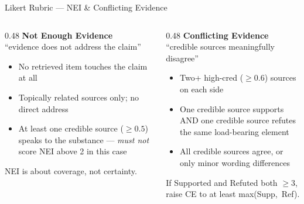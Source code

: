 \documentclass[11pt, aspectratio=169]{beamer}
\begin{document}
\begin{frame}{Likert Rubric — NEI \& Conflicting Evidence}
  \begin{columns}[T]
    \begin{column}{0.48\textwidth}
      \textbf{\textcolor{slate}{Not Enough Evidence}}\\
      ``evidence does not address the claim''

      \bigskip
      \begin{itemize}\setlength{\itemsep}{8pt}
        \item[\textbf{5}] No retrieved item touches the claim at all
        \item[\textbf{3--4}] Topically related sources only; no direct address
        \item[\textbf{1--2}] At least one credible source ($\geq 0.5$) speaks to the substance — \emph{must not} score NEI above 2 in this case
      \end{itemize}

      \medskip
      {\small\textcolor{slate}{NEI is about coverage, not certainty.}}
    \end{column}
    \begin{column}{0.48\textwidth}
      \textbf{\textcolor{amber}{Conflicting Evidence}}\\
      ``credible sources meaningfully disagree''

      \bigskip
      \begin{itemize}\setlength{\itemsep}{8pt}
        \item[\textbf{5}] Two+ high-cred ($\geq 0.6$) sources on each side
        \item[\textbf{4}] One credible source supports AND one credible source refutes the same load-bearing element
        \item[\textbf{1--3}] All credible sources agree, or only minor wording differences
      \end{itemize}

      \medskip
      {\small\textcolor{slate}{If Supported and Refuted both $\geq 3$, raise CE to at least max(Supp,~Ref).}}
    \end{column}
  \end{columns}
\end{frame}
\end{document}
